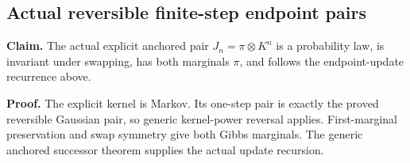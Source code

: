 \documentclass[11pt,a4paper]{report}
\begin{document}
\subsection{\texorpdfstring{Actual reversible finite-step endpoint pairs}{Actual reversible finite-step endpoint pairs}}
\label{report-step-WassersteinMixing-SemigroupMALAPair-lean-3}


\textbf{Claim.} The actual explicit anchored pair \(J_n=\pi\otimes K^n\) is a probability law, is invariant under swapping, has both marginals \(\pi\), and follows the endpoint-update recurrence above.



\textbf{Proof.} The explicit kernel is Markov. Its one-step pair is exactly the proved reversible Gaussian pair, so generic kernel-power reversal applies. First-marginal preservation and swap symmetry give both Gibbs marginals. The generic anchored successor theorem supplies the actual update recursion.
\end{document}
